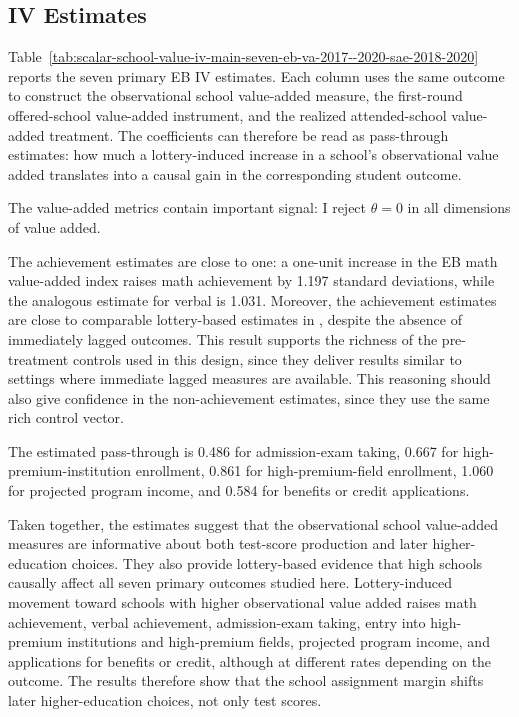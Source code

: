 \documentclass[a4paper, article, english, oneside, unknownkeysallowed, 12pt]{memoir}
\begin{document}
\subsection{IV Estimates}


Table~\ref{tab:scalar-school-value-iv-main-seven-eb-va-2017--2020-sae-2018-2020} reports the seven primary EB IV estimates.
Each column uses the same outcome to construct the observational school value-added measure, the first-round offered-school value-added instrument, and the realized attended-school value-added treatment.
The coefficients can therefore be read as pass-through estimates: how much a lottery-induced increase in a school's observational value added translates into a causal gain in the corresponding student outcome.

The value-added metrics contain important signal: I reject $\theta = 0$ in all dimensions of value added.

The achievement estimates are close to one: a one-unit increase in the EB math value-added index raises math achievement by 1.197 standard deviations, while the analogous estimate for verbal is 1.031.
Moreover, the achievement estimates are close to comparable lottery-based estimates in \textcite{angrist_leveraging_2017}, despite the absence of immediately lagged outcomes.
This result supports the richness of the pre-treatment controls used in this design, since they deliver results similar to settings where immediate lagged measures are available.
This reasoning should also give confidence in the non-achievement estimates, since they use the same rich control vector.

The estimated pass-through is 0.486 for admission-exam taking, 0.667 for high-premium-institution enrollment, 0.861 for high-premium-field enrollment, 1.060 for projected program income, and 0.584 for benefits or credit applications.

Taken together, the estimates suggest that the observational school value-added measures are informative about both test-score production and later higher-education choices.
They also provide lottery-based evidence that high schools causally affect all seven primary outcomes studied here.
Lottery-induced movement toward schools with higher observational value added raises math achievement, verbal achievement, admission-exam taking, entry into high-premium institutions and high-premium fields, projected program income, and applications for benefits or credit, although at different rates depending on the outcome.
The results therefore show that the school assignment margin shifts later higher-education choices, not only test scores.
\end{document}
